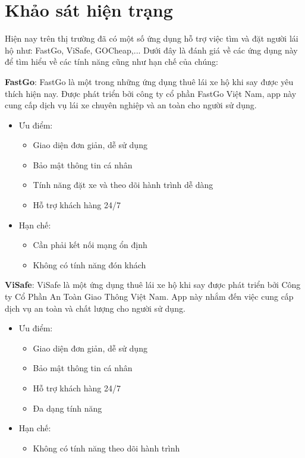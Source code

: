 \documentclass[../DoAn.tex]{subfiles}
\begin{document}
\section{Khảo sát hiện trạng}
\label{section:2.1}

Hiện nay trên thị trường đã có một số ứng dụng hỗ trợ việc tìm và đặt người lái hộ như: FastGo, ViSafe, GOCheap,...
Dưới đây là đánh giá về các ứng dụng này để tìm hiểu về các tính năng cũng như hạn chế của chúng:

\textbf{FastGo}: FastGo là một trong những ứng dụng thuê lái xe hộ khi say được yêu thích hiện nay. 
Được phát triển bởi công ty cổ phần FastGo Việt Nam, app này cung cấp dịch vụ lái xe chuyên nghiệp và an toàn cho người sử dụng.
\begin{itemize}
    \item Ưu điểm:
      \begin{itemize}
        \item Giao diện đơn giản, dễ sử dụng
        \item Bảo mật thông tin cá nhân
        \item Tính năng đặt xe và theo dõi hành trình dễ dàng
        \item Hỗ trợ khách hàng 24/7
      \end{itemize}
    \item Hạn chế:
      \begin{itemize}
        \item Cần phải kết nối mạng ổn định
        \item Không có tính năng đón khách
      \end{itemize}
\end{itemize}

\textbf{ViSafe}: ViSafe là một ứng dụng thuê lái xe hộ khi say được phát triển bởi Công ty Cổ Phần An Toàn Giao Thông Việt Nam. App này nhắm đến việc cung cấp dịch vụ an toàn và chất lượng cho người sử dụng.
\begin{itemize}
    \item Ưu điểm:
      \begin{itemize}
        \item Giao diện đơn giản, dễ sử dụng
        \item Bảo mật thông tin cá nhân
        \item Hỗ trợ khách hàng 24/7
        \item Đa dạng tính năng
      \end{itemize}
    \item Hạn chế:
      \begin{itemize}
        \item Không có tính năng theo dõi hành trình
      \end{itemize}
\end{itemize}
\end{document}
